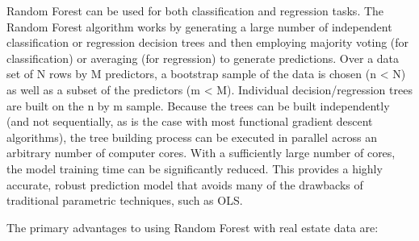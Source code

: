 \documentclass[12pt,]{article}
\begin{document}
Random Forest can be used for both classification and regression tasks.
The Random Forest algorithm works by generating a large number of
independent classification or regression decision trees and then
employing majority voting (for classification) or averaging (for
regression) to generate predictions. Over a data set of N rows by M
predictors, a bootstrap sample of the data is chosen (n \textless{} N)
as well as a subset of the predictors (m \textless{} M). Individual
decision/regression trees are built on the n by m sample. Because the
trees can be built independently (and not sequentially, as is the case
with most functional gradient descent algorithms), the tree building
process can be executed in parallel across an arbitrary number of
computer cores. With a sufficiently large number of cores, the model
training time can be significantly reduced. This provides a highly
accurate, robust prediction model that avoids many of the drawbacks of
traditional parametric techniques, such as OLS.

The primary advantages to using Random Forest with real estate data are:
\end{document}

